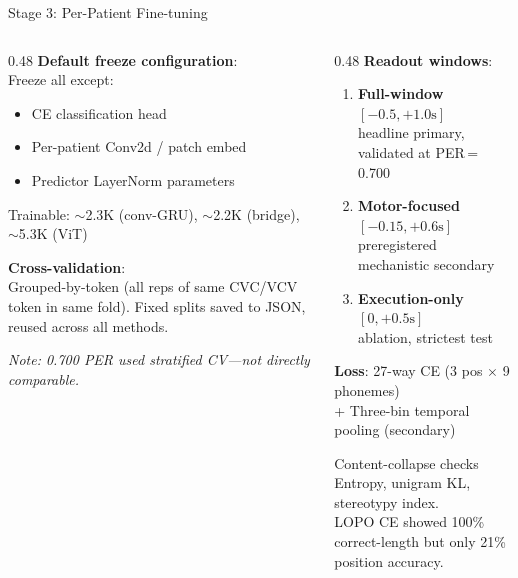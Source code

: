 \documentclass[aspectratio=169, 11pt]{beamer}
\begin{document}
\begin{frame}{Stage 3: Per-Patient Fine-tuning}

\begin{columns}[T]
\begin{column}{0.48\textwidth}
\textbf{Default freeze configuration}:\\
Freeze all except:
\begin{itemize}
  \item CE classification head
  \item Per-patient Conv2d / patch embed
  \item Predictor LayerNorm parameters
\end{itemize}

\vspace{0.2em}
\small
Trainable: $\sim$2.3K (conv-GRU), $\sim$2.2K (bridge), $\sim$5.3K (ViT)

\vspace{0.5em}
\textbf{Cross-validation}:\\
Grouped-by-token (all reps of same CVC/VCV token in same fold). Fixed splits saved to JSON, reused across all methods.

\vspace{0.2em}
{\footnotesize\itshape Note: 0.700 PER used stratified CV---not directly comparable.}
\end{column}

\begin{column}{0.48\textwidth}
\textbf{Readout windows}:
\begin{enumerate}
  \item \textbf{Full-window} $[-0.5, +1.0\text{s}]$\\
    {\small headline primary, validated at PER\,=\,0.700}
  \item \textbf{Motor-focused} $[-0.15, +0.6\text{s}]$\\
    {\small preregistered mechanistic secondary}
  \item \textbf{Execution-only} $[0, +0.5\text{s}]$\\
    {\small ablation, strictest test}
\end{enumerate}

\vspace{0.4em}
\textbf{Loss}: 27-way CE (3 pos $\times$ 9 phonemes)\\
+ Three-bin temporal pooling (secondary)

\vspace{0.4em}
\begin{block}{\small Content-collapse checks}
\scriptsize
Entropy, unigram KL, stereotypy index.\\
LOPO CE showed 100\% correct-length but only 21\% position accuracy.
\end{block}
\end{column}
\end{columns}
\end{frame}
\end{document}

